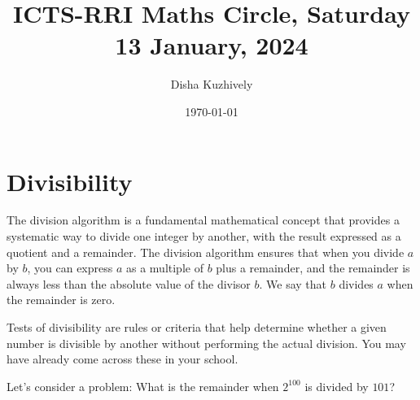 \documentclass[a4paper,12pt]{article}
\title{ICTS-RRI Maths Circle, Saturday 13 January, 2024}
\author{Disha Kuzhively}
\date{\today}
\begin{document}
\maketitle

\section*{Divisibility}
The division algorithm is a fundamental mathematical concept that provides a systematic way to divide one integer by another, with the result expressed as a quotient and a remainder. The division algorithm ensures that when you divide $a$ by $b$, you can express $a$ as a multiple of $b$ plus a remainder, and the remainder is always less than the absolute value of the divisor $b$. We say that $b$ divides $a$ when the remainder is zero.

Tests of divisibility are rules or criteria that help determine whether a given number is divisible by another without performing the actual division. You may have already come across these in your school.

Let's consider a problem: What is the remainder when $2^{100}$ is divided by $101$?
\end{document}
